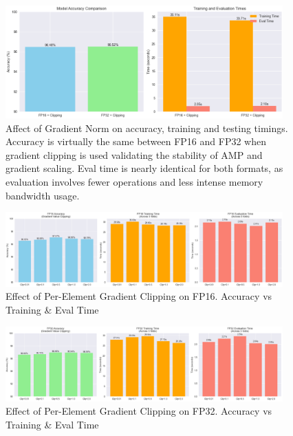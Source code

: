\documentclass[11pt]{article}
\begin{document}
\begin{figure}[H]
	\centering
	\includegraphics[width=0.95\textwidth]{figures/FP16_32_clipping.png}
	\caption{Affect of Gradient Norm on accuracy, training and testing timings.
		Accuracy is virtually the same between FP16 and FP32 when gradient clipping is used
		validating the stability of AMP and gradient scaling.
		Eval time is nearly identical for both formats, as evaluation involves fewer operations
		and less intense memory bandwidth usage.}
\end{figure}

\begin{figure}[H]
	\centering
	\includegraphics[width=0.95\textwidth]{figures/gradclip_16.png}
	\caption{Effect of Per-Element Gradient Clipping on FP16. Accuracy vs Training \& Eval Time}\label{fig:grad16}
\end{figure}

\begin{figure}[H]
	\centering
	\includegraphics[width=0.95\textwidth]{figures/gradclip_32.png}
	\caption{Effect of Per-Element Gradient Clipping on FP32. Accuracy vs Training \& Eval Time}\label{fig:grad32}
\end{figure}
\end{document}
